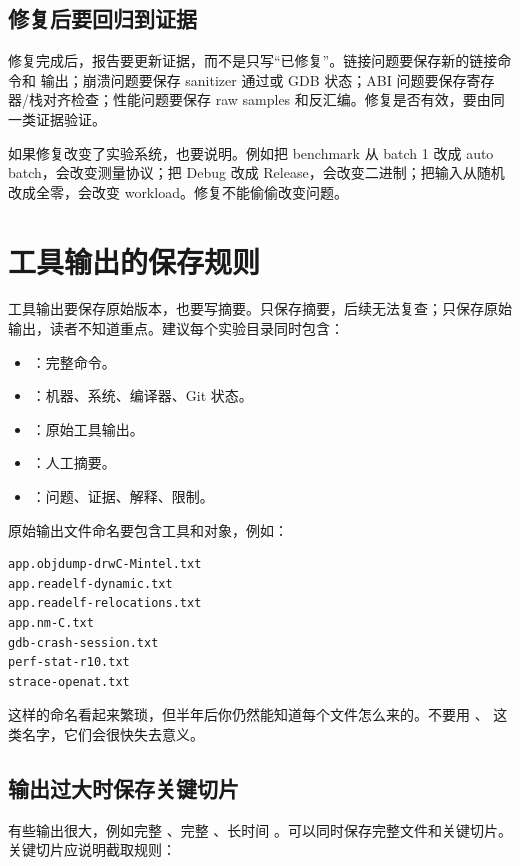 \subsection{修复后要回归到证据}

修复完成后，报告要更新证据，而不是只写“已修复”。链接问题要保存新的链接命令和  输出；崩溃问题要保存 sanitizer 通过或 GDB 状态；ABI 问题要保存寄存器/栈对齐检查；性能问题要保存 raw samples 和反汇编。修复是否有效，要由同一类证据验证。

如果修复改变了实验系统，也要说明。例如把 benchmark 从 batch 1 改成 auto batch，会改变测量协议；把 Debug 改成 Release，会改变二进制；把输入从随机改成全零，会改变 workload。修复不能偷偷改变问题。

\section{工具输出的保存规则}

工具输出要保存原始版本，也要写摘要。只保存摘要，后续无法复查；只保存原始输出，读者不知道重点。建议每个实验目录同时包含：

\begin{itemize}
  \item {}：完整命令。
  \item {}：机器、系统、编译器、Git 状态。
  \item {}：原始工具输出。
  \item {}：人工摘要。
  \item {}：问题、证据、解释、限制。
\end{itemize}

原始输出文件命名要包含工具和对象，例如：

\begin{lstlisting}
app.objdump-drwC-Mintel.txt
app.readelf-dynamic.txt
app.readelf-relocations.txt
app.nm-C.txt
gdb-crash-session.txt
perf-stat-r10.txt
strace-openat.txt
\end{lstlisting}

这样的命名看起来繁琐，但半年后你仍然能知道每个文件怎么来的。不要用 、 这类名字，它们会很快失去意义。

\subsection{输出过大时保存关键切片}

有些输出很大，例如完整 、完整 、长时间 。可以同时保存完整文件和关键切片。关键切片应说明截取规则：

